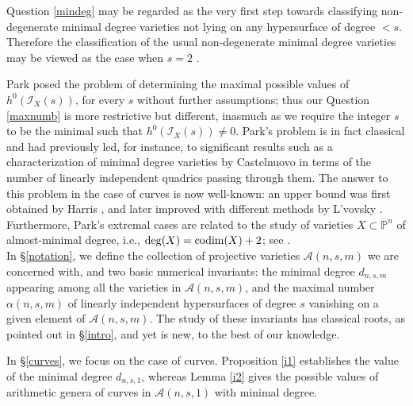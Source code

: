 \documentclass[a4, 11pt]{amsart}
\theoremstyle{plain}
\theoremstyle{definition}
\newcommand{\enm}[1]{\ensuremath{#1}}          %
\newcommand{\cal}[1]{\mathcal{#1}}
\newcommand{\PP}{\enm{\mathbb{P}}}
\newcommand{\Aa}{\enm{\cal{A}}}
\begin{document}
Question \ref{mindeg} may be regarded as the very first step towards classifying non-degenerate minimal degree varieties not lying on any hypersurface of degree $< s$. Therefore the classification of the usual non-degenerate minimal degree varieties may be viewed as the case when $s=2$ \cite{hsv, park1}. 
 
Park \cite[Problem A]{park} posed the problem of determining the maximal possible values of $h^0(\mathcal I_X(s))$, for every $s$ without further assumptions; thus our Question \ref{maxnumb} is more restrictive but different, inasmuch as we require the integer $s$ to be the minimal such that $h^0(\mathcal I_X(s))\neq 0$. Park's problem is in fact classical and had previously led, for instance, to significant results such as a characterization of minimal degree varieties by Castelnuovo in terms of the number of linearly independent quadrics passing through them. The answer to this problem in the case of curves is now well-known: an upper bound was first obtained by Harris \cite{harris81}, and later improved with different methods by L'vovsky \cite{Lvov96}. Furthermore, Park's extremal cases are related to the study of varieties $X\subset \PP^n$ of almost-minimal degree, i.e., $\deg(X)=\textnormal{codim}(X)+2$; see \cite{bs, fu, park1, hsv}.\\

 In \S\ref{notation}, we define the collection of projective varieties $\Aa(n,s,m)$ we are concerned with, and two basic numerical invariants: the minimal degree $d_{n,s,m}$ appearing among all the varieties in $\Aa(n,s,m)$, and 
the maximal number $\alpha(n,s,m)$ of linearly independent hypersurfaces of degree $s$ vanishing on a given element of $\Aa(n,s,m)$. 
The study of these invariants has classical roots, as pointed out in \S\ref{intro}, and yet is new, to the best of our knowledge.  

In \S\ref{curves}, we focus on the case of curves. Proposition \ref{i1} establishes the value of the minimal degree $d_{n,s,1}$, whereas Lemma \ref{i2}
gives the possible values of arithmetic genera of curves in $\Aa(n,s,1)$ with minimal degree.
\end{document}
